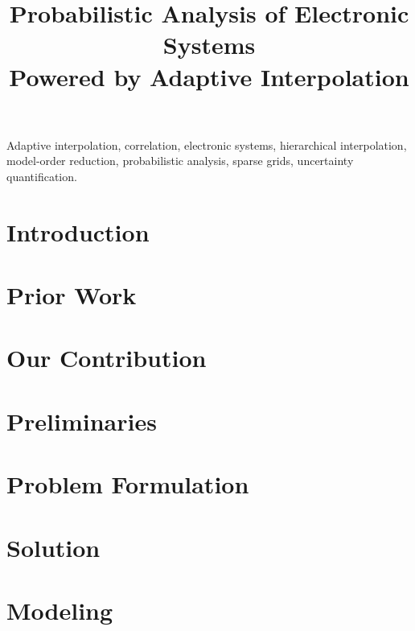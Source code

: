 \documentclass[journal]{IEEEtran}
\title{
  Probabilistic Analysis of Electronic Systems\\
  Powered by Adaptive Interpolation
}
\author{}
\begin{document}
  \maketitle

  \begin{abstract}
    
  \end{abstract}

  \begin{IEEEkeywords}
    Adaptive interpolation,
    correlation,
    electronic systems,
    hierarchical interpolation,
    model-order reduction,
    probabilistic analysis,
    sparse grids,
    uncertainty quantification.
  \end{IEEEkeywords}


  \section{Introduction} 
  

  \section{Prior Work} 
  

  \section{Our Contribution} 
  

  \section{Preliminaries} 
  

  \section{Problem Formulation} 
  

  \section{Solution} 
  

  \section{Modeling} 
  
\end{document}

